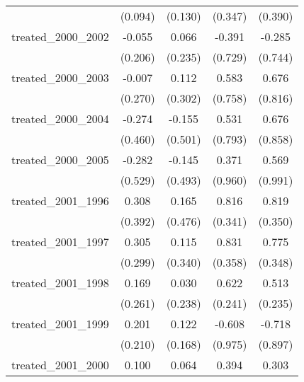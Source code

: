 {\begin{tabular}{l*{4}{c}}
            &     (0.094)         &     (0.130)         &     (0.347)         &     (0.390)         \\
[1em]
treated\_2000\_2002&      -0.055         &       0.066         &      -0.391         &      -0.285         \\
            &     (0.206)         &     (0.235)         &     (0.729)         &     (0.744)         \\
[1em]
treated\_2000\_2003&      -0.007         &       0.112         &       0.583         &       0.676         \\
            &     (0.270)         &     (0.302)         &     (0.758)         &     (0.816)         \\
[1em]
treated\_2000\_2004&      -0.274         &      -0.155         &       0.531         &       0.676         \\
            &     (0.460)         &     (0.501)         &     (0.793)         &     (0.858)         \\
[1em]
treated\_2000\_2005&      -0.282         &      -0.145         &       0.371         &       0.569         \\
            &     (0.529)         &     (0.493)         &     (0.960)         &     (0.991)         \\
[1em]
treated\_2001\_1996&       0.308         &       0.165         &       0.816\sym{*}  &       0.819\sym{*}  \\
            &     (0.392)         &     (0.476)         &     (0.341)         &     (0.350)         \\
[1em]
treated\_2001\_1997&       0.305         &       0.115         &       0.831\sym{*}  &       0.775\sym{*}  \\
            &     (0.299)         &     (0.340)         &     (0.358)         &     (0.348)         \\
[1em]
treated\_2001\_1998&       0.169         &       0.030         &       0.622\sym{*}  &       0.513\sym{*}  \\
            &     (0.261)         &     (0.238)         &     (0.241)         &     (0.235)         \\
[1em]
treated\_2001\_1999&       0.201         &       0.122         &      -0.608         &      -0.718         \\
            &     (0.210)         &     (0.168)         &     (0.975)         &     (0.897)         \\
[1em]
treated\_2001\_2000&       0.100         &       0.064         &       0.394\sym{***}&       0.303\sym{***}\\

\end{tabular}}
